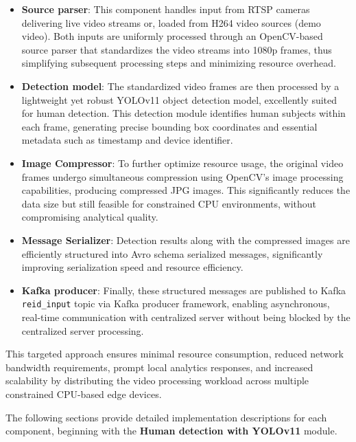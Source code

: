 \begin{itemize}
    \item \textbf{Source parser}: This component handles input from RTSP cameras delivering live video streams or, loaded from H264 video sources (demo video). Both inputs are uniformly processed through an OpenCV-based source parser that standardizes the video streams into 1080p frames, thus simplifying subsequent processing steps and minimizing resource overhead.
    
    \item \textbf{Detection model}: The standardized video frames are then processed by a lightweight yet robust YOLOv11 object detection model, excellently suited for human detection. This detection module identifies human subjects within each frame, generating precise bounding box coordinates and essential metadata such as timestamp and device identifier.
    
    \item \textbf{Image Compressor}: To further optimize resource usage, the original video frames undergo simultaneous compression using OpenCV's image processing capabilities, producing compressed JPG images. This significantly reduces the data size but still feasible for constrained CPU environments, without compromising analytical quality.
    
    \item \textbf{Message Serializer}: Detection results along with the compressed images are efficiently structured into Avro schema serialized messages, significantly improving serialization speed and resource efficiency.
    
    \item \textbf{Kafka producer}: Finally, these structured messages are published to Kafka \texttt{reid\_input} topic via Kafka producer framework, enabling asynchronous, real-time communication with centralized server without being blocked by the centralized server processing.
\end{itemize}

This targeted approach ensures minimal resource consumption, reduced network bandwidth requirements, prompt local analytics responses, and increased scalability by distributing the video processing workload across multiple constrained CPU-based edge devices.

The following sections provide detailed implementation descriptions for each component, beginning with the \textbf{Human detection with YOLOv11} module.

